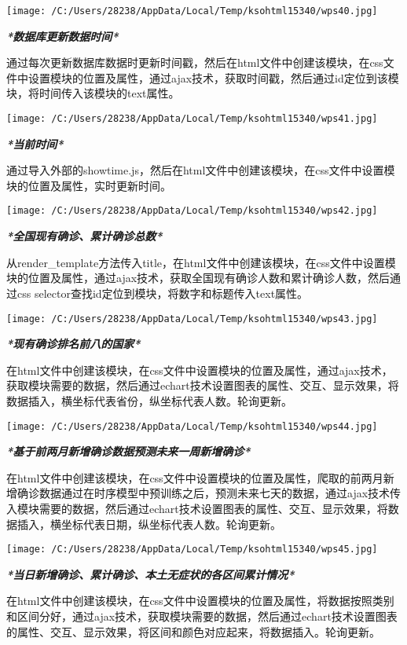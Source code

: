 \documentclass[
]{article}
\begin{document}
\texttt{[image: /C:/Users/28238/AppData/Local/Temp/ksohtml15340/wps40.jpg]}

\emph{\textbf{*数据库更新数据时间*}}

通过每次更新数据库数据时更新时间戳，然后在html文件中创建该模块，在css文件中设置模块的位置及属性，通过ajax技术，获取时间戳，然后通过id定位到该模块，将时间传入该模块的text属性。

\texttt{[image: /C:/Users/28238/AppData/Local/Temp/ksohtml15340/wps41.jpg]}

\emph{\textbf{*当前时间*}}

通过导入外部的showtime.js，然后在html文件中创建该模块，在css文件中设置模块的位置及属性，实时更新时间。

\texttt{[image: /C:/Users/28238/AppData/Local/Temp/ksohtml15340/wps42.jpg]}

\emph{\textbf{*全国现有确诊、累计确诊总数*}}

从render\_template方法传入title，在html文件中创建该模块，在css文件中设置模块的位置及属性，通过ajax技术，获取全国现有确诊人数和累计确诊人数，然后通过css
selector查找id定位到模块，将数字和标题传入text属性。

\texttt{[image: /C:/Users/28238/AppData/Local/Temp/ksohtml15340/wps43.jpg]}

\emph{\textbf{*现有确诊排名前八的国家*}}

在html文件中创建该模块，在css文件中设置模块的位置及属性，通过ajax技术，获取模块需要的数据，然后通过echart技术设置图表的属性、交互、显示效果，将数据插入，横坐标代表省份，纵坐标代表人数。轮询更新。

\texttt{[image: /C:/Users/28238/AppData/Local/Temp/ksohtml15340/wps44.jpg]}

\emph{\textbf{*基于前两月新增确诊数据预测未来一周新增确诊*}}

在html文件中创建该模块，在css文件中设置模块的位置及属性，爬取的前两月新增确诊数据通过在时序模型中预训练之后，预测未来七天的数据，通过ajax技术传入模块需要的数据，然后通过echart技术设置图表的属性、交互、显示效果，将数据插入，横坐标代表日期，纵坐标代表人数。轮询更新。

\texttt{[image: /C:/Users/28238/AppData/Local/Temp/ksohtml15340/wps45.jpg]}

\emph{\textbf{*当日新增确诊、累计确诊、本土无症状的各区间累计情况*}}

在html文件中创建该模块，在css文件中设置模块的位置及属性，将数据按照类别和区间分好，通过ajax技术，获取模块需要的数据，然后通过echart技术设置图表的属性、交互、显示效果，将区间和颜色对应起来，将数据插入。轮询更新。
\end{document}
